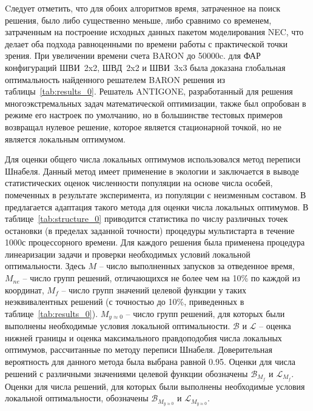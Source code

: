 Cледует отметить, что для обоих алгоритмов время, затраченное на поиск решения, было либо существенно меньше, либо сравнимо со временем, затраченным на построение исходных данных пакетом моделирования NEC, что делает оба подхода равноценными по времени работы с практической точки зрения. При увеличении времени счета BARON до 50000c. для ФАР конфигураций ШВИ~2x2, ШВД~2x2 и ШВИ~3x3 была доказана глобальная оптимальность найденного решателем BARON решения из таблицы~\ref{tab:results_0}.
Решатель ANTIGONE, разработанный для решения многоэкстремальных задач математической оптимизации, также был опробован в режиме его настроек по умолчанию, но в большинстве тестовых примеров возвращал нулевое решение, которое является стационарной точкой, но не является локальным оптимумом.

Для оценки общего числа локальных оптимумов использовался метод переписи Шнабеля. Данный метод имеет применение в экологии и заключается в
выводе статистических оценок численности популяции на основе числа особей, помеченных в результате эксперимента, из популяции с неизменным
составом. В~ предлагается адаптация такого метода для оценки числа локальных оптимумов. В таблице~\ref{tab:structure_0} приводится статистика по числу различных точек остановки (в пределах заданной точности) процедуры мультистарта в течение 1000с процессорного времени. Для каждого решения была применена процедура линеаризации задачи и проверки необходимых условий локальной оптимальности. Здесь {$M$} -- число выполненных запусков за отведенное время, $M_{ne}$ -- число групп решений, отличающихся не более чем на 10\% по каждой из координат, {$M_{f}$} -- число групп значений целевой функции у таких неэквивалентных решений (с точностью до 10\%, приведенных в таблице~\ref{tab:results_0}). {$M_{y\approx0}$} -- число групп решений, для которых были выполнены необходимые условия локальной оптимальности. $\mathcal{B}$ и $\mathcal{L}$ -- оценка нижней границы и оценка максимального правдоподобия числа локальных оптимумов, рассчитанные по методу переписи Шнабеля. Доверительная вероятность для данного метода была выбрана равной 0.95. Оценки для числа решений с различными значениями целевой функции обозначены $\mathcal{B}_{M_f}$ и $\mathcal{L}_{M_f}$. Оценки для числа решений, для которых были выполнены необходимые условия локальной оптимальности, обозначены $\mathcal{B}_{M_{y\approx0}}$ и $\mathcal{L}_{M_{y\approx0}}$.


